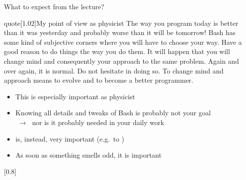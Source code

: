 \begin{frame}{What to expect from the lecture?}
    \vspace{-3mm}
    \begin{varblock}{quote}[1.02\textwidth]{My point of view as physicist}
        The way you program today is better than it was yesterday and probably worse than it will be tomorrow!
        Bash has some kind of subjective corners where you will have to choose your way.
        Have a good reason to do things the way you do them.
        It will happen that you will change mind and consequently your approach to the same problem.
        Again and over again, it is normal.
        Do not hesitate in doing so.
        To change mind and approach means to evolve and to become a better programmer.
    \end{varblock}
    \begin{itemize}
        \item This is especially important as physicist
        \item Knowing all details and tweaks of Bash is probably not your goal \\
              $\;\to\;$ nor is it probably needed in your daily work
        \item {} is, instead, very important (e.g.\ to )
        \item As soon as something smells odd, it is important 
    \end{itemize}
    \begin{varblock}{}[0.8\textwidth]{}%
    \end{varblock}
    
\end{frame}
